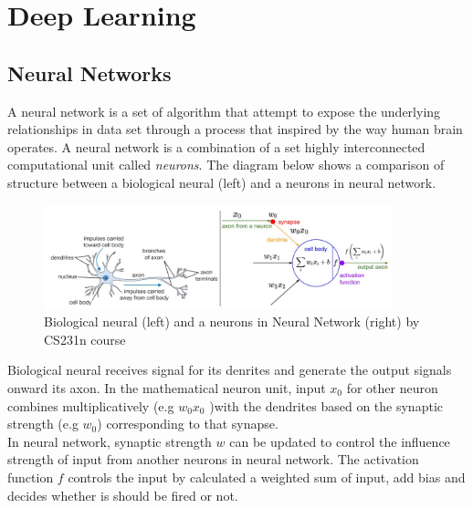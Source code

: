 \chapter{Deep Learning}

\section{Neural Networks}

\hspace{0.5cm}A neural network is a set of algorithm that attempt to expose the underlying relationships in data set through a process that inspired by the way human brain operates. A neural network is a combination of a set highly interconnected computational unit called \textit{neurons}. The diagram below shows a comparison of structure between a biological neural (left) and a neurons in neural network.
\begin{figure}[h!]
    \centering
    \includegraphics[width=0.9\textwidth]{Chapters/Fig/neural_arc.PNG}
    \caption{Biological neural (left) and a neurons in Neural Network (right) by CS231n course}
    \label{fig:nn_arc}
\end{figure}
Biological neural receives signal for its denrites and generate the output signals onward its axon. In the mathematical neuron unit, input $x_0$ for other neuron combines multiplicatively (e.g $w_0x_0$ )with the dendrites based on the synaptic strength (e.g $w_0$) corresponding to that synapse.\\
In neural network, synaptic strength $w$ can be updated to control the influence strength of input from another neurons in neural network. The activation function $f$ controls the input by calculated a weighted sum of input, add bias and decides whether is should be fired or not.
